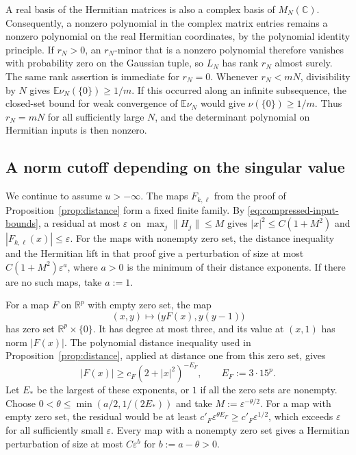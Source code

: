 A real basis of the Hermitian matrices is also a complex basis of $M_N(\mathbb C)$.
Consequently, a nonzero polynomial in the complex matrix entries remains a nonzero polynomial on the real Hermitian coordinates, by the polynomial identity principle.
If $r_N>0$, an $r_N$-minor that is a nonzero polynomial therefore vanishes with probability zero on the Gaussian tuple, so $L_N$ has rank $r_N$ almost surely.
The same rank assertion is immediate for $r_N=0$.
Whenever $r_N<mN$, divisibility by $N$ gives $\mathbb E\nu_N(\{0\})\ge 1/m$.
If this occurred along an infinite subsequence, the closed-set bound for weak convergence of $\mathbb E\nu_N$ would give $\nu(\{0\})\ge1/m$.
Thus $r_N=mN$ for all sufficiently large $N$, and the determinant polynomial on Hermitian inputs is then nonzero.

\subsection{A norm cutoff depending on the singular value}\label{subsec:global-floor}

We continue to assume $u>-\infty$.
The maps $F_{k,\ell}$ from the proof of Proposition~\ref{prop:distance} form a fixed finite family.
By \eqref{eq:compressed-input-bounds}, a residual at most $\varepsilon$ on $\max_j\|H_j\|\le M$ gives $|x|^2\le C(1+M^2)$ and $|F_{k,\ell}(x)|\le\varepsilon$.
For the maps with nonempty zero set, the distance inequality and the Hermitian lift in that proof give a perturbation of size at most $C(1+M^2)\varepsilon^a$, where $a>0$ is the minimum of their distance exponents.
If there are no such maps, take $a:=1$.

For a map $F$ on $\mathbb R^p$ with empty zero set, the map
\[
 (x,y)\longmapsto \bigl(yF(x),y(y-1)\bigr)
\]
has zero set $\mathbb R^p\times\{0\}$.
It has degree at most three, and its value at $(x,1)$ has norm $|F(x)|$.
The polynomial distance inequality used in Proposition~\ref{prop:distance}, applied at distance one from this zero set, gives
\[
 |F(x)|\ge c_F(2+|x|^2)^{-E_F},\qquad E_F:=3\cdot15^p.
\]
Let $E_*$ be the largest of these exponents, or $1$ if all the zero sets are nonempty.
Choose $0<\theta\le\min(a/2,1/(2E_*))$ and take $M:=\varepsilon^{-\theta/2}$.
For a map with empty zero set, the residual would be at least $c'_F\varepsilon^{\theta E_F}\ge c'_F\varepsilon^{1/2}$, which exceeds $\varepsilon$ for all sufficiently small $\varepsilon$.
Every map with a nonempty zero set gives a Hermitian perturbation of size at most $C\varepsilon^b$ for $b:=a-\theta>0$.

